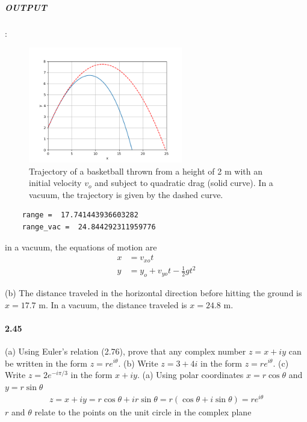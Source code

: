 \documentclass[../problems.tex]{subfiles}
\begin{document}
\subparagraph{OUTPUT}:

\begin{figure}[ht]
    \centering
    \includegraphics[width=0.6\textwidth]{fig2_43.png}
    \captionsetup{width=0.8\textwidth}
    \caption{Trajectory of a basketball thrown from a height of 2 m with an initial velocity $v_o$
    and subject to quadratic drag (solid curve). In a vacuum, the trajectory is given by the dashed
    curve.}
    \label{fig:2_43}
\end{figure} 
\begin{verbatim}
    range =  17.741443936603282
    range_vac =  24.844292311959776
\end{verbatim}

in a vacuum, the equations of motion are
\begin{align*}
    x &= v_{xo} t \\
    y &= y_o + v_{yo} t - \frac{1}{2} g t^2
\end{align*}

(b) The distance traveled in the horizontal direction before hitting the ground is $x = 17.7$ m. In
a vacuum, the distance traveled is $x = 24.8$ m.

\paragraph{2.45} (a) Using Euler's relation (2.76), prove that any complex number $z= x+iy$ can be
written in the form $z=re^{i\theta}$. (b) Write $z = 3 + 4i$ in the form $z = re^{i\theta}$.
(c) Write $z = 2e^{-i\pi/3}$ in the form $x + iy$.
\barh 
(a) Using polar coordinates $x = r\cos\theta$ and $y = r\sin\theta$
\begin{align*}
    z = x + iy = r\cos\theta + i r\sin\theta = r(\cos\theta + i\sin\theta) = re^{i\theta}
\end{align*}
$r$ and $\theta$ relate to the points on the unit circle in the complex plane
\end{document}
